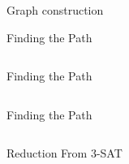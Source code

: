 \documentclass[xcolor=dvipsnames]{beamer}
\begin{document}
\begin{section}{Graph construction }
\begin{frame}{Finding the Path}
\begin{columns}
\begin{column}{0.45\textwidth}
    
\end{column}
\begin{column}{0.55\textwidth}
    \begin{overlayarea}{0.55\textwidth}{8cm}
    \end{overlayarea}
\end{column}
\end{columns}
\end{frame}

\begin{frame}{Finding the Path}
\begin{columns}
\begin{column}{0.45\textwidth}
    
\end{column}
\begin{column}{0.55\textwidth}
    \begin{overlayarea}{0.55\textwidth}{8cm}
    \end{overlayarea}
\end{column}
\end{columns}
\end{frame}

\begin{frame}{Finding the Path}
\begin{columns}
\begin{column}{0.45\textwidth}
    
\end{column}
\begin{column}{0.55\textwidth}
    \begin{overlayarea}{0.55\textwidth}{8cm}
    \end{overlayarea}
\end{column}
\end{columns}
\end{frame}

\begin{section}{Reduction From 3-SAT}



\end{section}



\end{section}
\end{document}
